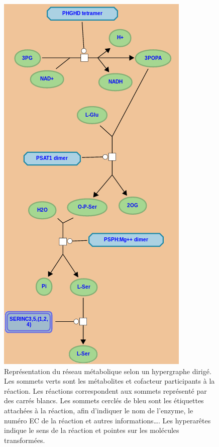\begin{refsegment}
\begin{shadedfigure}[H]
\begin{subfigure}[t]{.45\textwidth}
        \includegraphics[width=\textwidth]{img/reactome_homo_sapiens_serine_biosynthesis.png}
        \caption{ Représentation du réseau métabolique selon un hypergraphe dirigé. Les sommets verts sont les métabolites et cofacteur participants à la réaction. Les réactions correspondent aux sommets représenté par des carrés blancs. Les sommets cerclés de bleu sont les étiquettes attachées à la réaction, afin d'indiquer le nom de l'enzyme, le numéro \acrfull{EC} de la réaction et autres informations\ldots. Les hyperarêtes indique le sens de la réaction et pointes sur les molécules transformées. }
        \label{fig:reactome_serine}
    \end{subfigure}
    \end{shadedfigure}


\end{refsegment}

